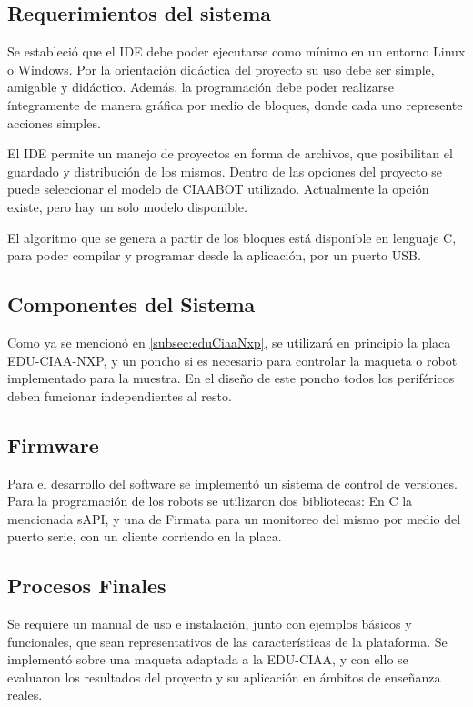 \subsection{Requerimientos del sistema}
\label{subsec:requerimientosSistema}
Se estableció que el IDE debe poder ejecutarse como mínimo en un entorno Linux o Windows. Por la orientación didáctica del proyecto su uso debe ser simple, amigable y didáctico. Además, la programación debe poder realizarse íntegramente de manera gráfica por medio de bloques, donde cada uno represente acciones simples.

El IDE permite un manejo de proyectos en forma de archivos, que posibilitan el guardado y distribución de los mismos. Dentro de las opciones del proyecto se puede seleccionar el modelo de CIAABOT utilizado. Actualmente la opción existe, pero hay un solo modelo disponible.

El algoritmo que se genera a partir de los bloques está disponible en lenguaje C, para poder compilar y programar desde la aplicación, por un puerto USB.

\subsection{Componentes del Sistema}
\label{subsec:componentesSistema}
Como ya se mencionó en \ref{subsec:eduCiaaNxp}, se utilizará en principio la placa EDU-CIAA-NXP, y un poncho si es necesario para controlar la maqueta o robot implementado para la muestra. En el diseño de este poncho todos los periféricos deben funcionar independientes al resto.

\subsection{Firmware}
\label{subsec:firmware}
Para el desarrollo del software se implementó un sistema de control de versiones. Para la programación de los robots se utilizaron dos bibliotecas: En C la mencionada sAPI, y una de Firmata para un monitoreo del mismo por medio del puerto serie, con un cliente corriendo en la placa.

\subsection{Procesos Finales}
\label{subsec:procesosFinales}
Se requiere un manual de uso e instalación, junto con ejemplos básicos y funcionales, que sean representativos de las características de la plataforma. Se implementó sobre una maqueta adaptada a la EDU-CIAA, y con ello se evaluaron los resultados del proyecto y su aplicación en ámbitos de enseñanza reales.

